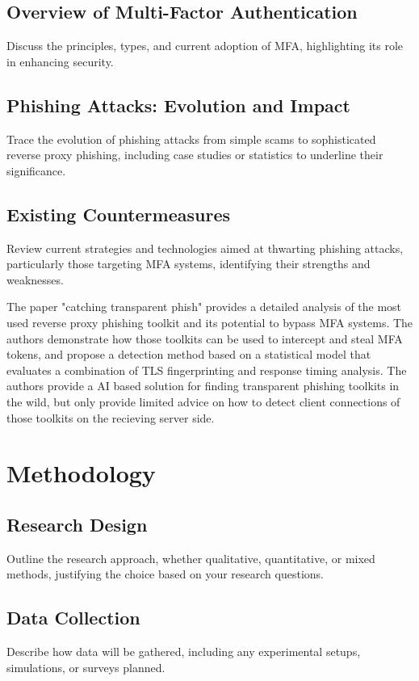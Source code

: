 \documentclass [14pt]{extarticle}
\begin{document}
\subsection{Overview of Multi-Factor Authentication}
Discuss the principles, types, and current adoption of MFA, highlighting its role in enhancing security.

\subsection{Phishing Attacks: Evolution and Impact}
Trace the evolution of phishing attacks from simple scams to sophisticated reverse proxy phishing, including case studies or statistics to underline their significance.
\subsection{Existing Countermeasures}
Review current strategies and technologies aimed at thwarting phishing attacks, particularly those targeting MFA systems, identifying their strengths and weaknesses.

The paper "catching transparent phish" \cite{linkUNKOWN} provides a detailed analysis of the most used reverse proxy phishing toolkit and its potential to bypass MFA systems. The authors demonstrate how those toolkits can be used to intercept and steal MFA tokens, and propose a detection method based on a statistical model that evaluates a combination of TLS fingerprinting and response timing analysis. The authors provide a AI based solution for finding transparent phishing toolkits in the wild, but only provide limited advice on how to detect client connections of those toolkits on the recieving server side.

\newpage

\section{Methodology}
\subsection{Research Design}
Outline the research approach, whether qualitative, quantitative, or mixed methods, justifying the choice based on your research questions.
\subsection{Data Collection}
Describe how data will be gathered, including any experimental setups, simulations, or surveys planned.
\end{document}
